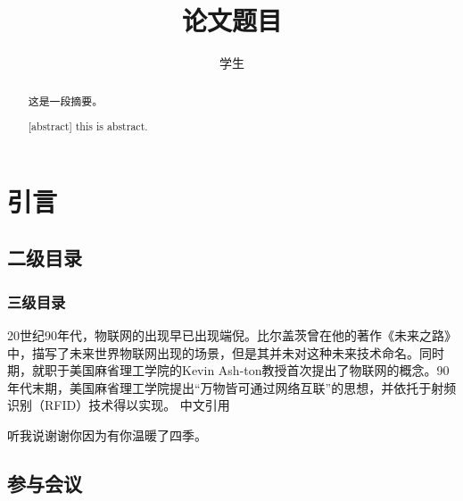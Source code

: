 \documentclass[]{GZUthesis}
\author{学生}
\title{论文题目}
\begin{document}
\maketitle
\frontmatter
\begin{abstract}
	这是一段摘要。
\end{abstract}
\begin{abstract}[abstract]
	this is abstract.
\end{abstract}
\tableofcontents
\mainmatter
\chapter{引言}
\section{二级目录}
\subsection{三级目录}
20世纪90年代，物联网的出现早已出现端倪。比尔盖茨曾在他的著作《未来之路》中，描写了未来世界物联网出现的场景，但是其并未对这种未来技术命名。\cite{gates1995road}同时期，就职于美国麻省理工学院的Kevin Ash-ton教授首次提出了物联网的概念。90年代末期，美国麻省理工学院提出“万物皆可通过网络互联”的思想，并依托于射频识别（RFID）技术得以实现。
中文引用\cite{孙其博2010物联网}

\begin{thank}
	听我说谢谢你因为有你温暖了四季。
\end{thank}
\printbibliography

\begin{appendices}
	\chapter{参与会议}
\end{appendices}
\promise
\end{document}
